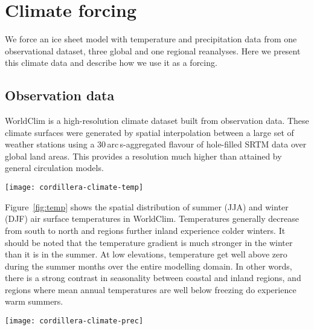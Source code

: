 
\section{Climate forcing}
\label{sec:climate}

We force an ice sheet model with temperature and precipitation data from one observational dataset, three global and one regional reanalyses. Here we present this climate data and describe how we use it as a forcing.

\subsection{Observation data}

WorldClim \citep{data:worldclim} is a high-resolution climate dataset built from observation data. These climate surfaces were generated by spatial interpolation between a large set of weather stations using a 30\,arc\,s-aggregated flavour of hole-filled SRTM data over global land areas. This provides a resolution much higher than attained by general circulation models.

\begin{figure*}[t]
	\vspace*{2mm}
	\begin{center}
		\texttt{[image: cordillera-climate-temp]}
	\end{center}
	\caption{Summer temperature maps from the five datasets used in this study and winter temperature map from the WorldClim dataset.}
	\label{fig:temp}
\end{figure*}

Figure~\ref{fig:temp} shows the spatial distribution of summer (JJA) and winter (DJF) air surface temperatures in WorldClim. Temperatures generally decrease from south to north and regions further inland experience colder winters. It should be noted that the temperature gradient is much stronger in the winter than it is in the summer. At low elevations, temperature get well above zero during the summer months over the entire modelling domain. In other words, there is a strong contrast in seasonality between coastal and inland regions, and regions where mean annual temperatures are well below freezing do experience warm summers.

\begin{figure*}[t]
	\vspace*{2mm}
	\begin{center}
		\texttt{[image: cordillera-climate-prec]}
	\end{center}
	\caption{Winter precipitation rate maps from the five datasets used in this study and summer precipitation map from the WorldClim dataset.}
	\label{fig:prec}
\end{figure*}

